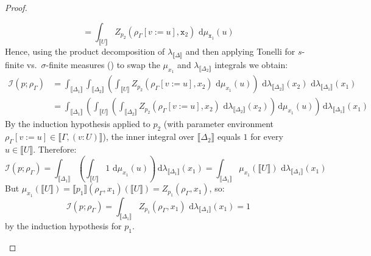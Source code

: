 \documentclass[preprint]{uai2026} %
\newcommand{\sem}[1]{\llbracket #1 \rrbracket}
\newcommand{\datavar}[1]{\mathtt{#1}}
\newcommand{\dd}{\,\mathrm{d}}
\begin{document}
\begin{proof}
\begin{itemize}
\[    =
    \int_{\sem{U}} Z_{p_2}(\rho_\Gamma[v:=u],\datavar{x}_2)\, \dd\mu_{\datavar{x}_1}(u)
    \]
    Hence, using the product decomposition of $\lambda_{\sem{\Delta}}$ and then applying Tonelli for $s$-finite vs.\ $\sigma$-finite measures () to swap the
    $\mu_{x_1}$ and $\lambda_{\sem{\Delta_2}}$ integrals
    we obtain:
    \begin{align*}
    \mathcal{I}(p;\rho_\Gamma)
    &=
    \int_{\sem{\Delta_1}}\int_{\sem{\Delta_2}}
    \left(\int_{\sem{U}} Z_{p_2}(\rho_\Gamma[v:=u],x_2)\, \dd\mu_{x_1}(u)\right)
    \, \dd\lambda_{\sem{\Delta_2}}(x_2)\, \dd\lambda_{\sem{\Delta_1}}(x_1)\\
    &=
    \int_{\sem{\Delta_1}}
    \left(
    \int_{\sem{U}}
    \left(\int_{\sem{\Delta_2}} Z_{p_2}(\rho_\Gamma[v:=u],x_2)\, \dd\lambda_{\sem{\Delta_2}}(x_2)\right)
    \dd\mu_{x_1}(u)
    \right)
    \dd\lambda_{\sem{\Delta_1}}(x_1)
    \end{align*}
    By the induction hypothesis applied to $p_2$ (with parameter environment $\rho_\Gamma[v:=u]\in\sem{\Gamma,(v:U)}$), the inner integral over $\sem{\Delta_2}$ equals $1$ for every $u\in\sem{U}$. Therefore:
    \[
    \mathcal{I}(p;\rho_\Gamma)
    =
    \int_{\sem{\Delta_1}}
    \left(
    \int_{\sem{U}} 1\, \dd\mu_{x_1}(u)
    \right)
    \dd\lambda_{\sem{\Delta_1}}(x_1)
    =
    \int_{\sem{\Delta_1}} \mu_{x_1}(\sem{U})\, \dd\lambda_{\sem{\Delta_1}}(x_1)
    \]
    But $\mu_{x_1}(\sem{U})=\sem{p_1}(\rho_\Gamma,x_1)(\sem{U})=Z_{p_1}(\rho_\Gamma,x_1)$, so:
    \[
    \mathcal{I}(p;\rho_\Gamma) = \int_{\sem{\Delta_1}} Z_{p_1}(\rho_\Gamma,x_1)\, \dd\lambda_{\sem{\Delta_1}}(x_1) = 1
    \]
    by the induction hypothesis for $p_1$.


\end{itemize}
\end{proof}
\end{document}

